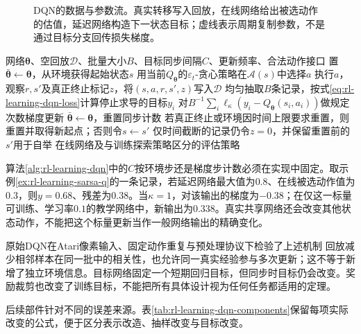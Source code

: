 \begin{figure}[t]
  \centering
  
  \caption{DQN的数据与参数流。真实转移写入回放，在线网络给出被选动作的估值，延迟网络构造下一状态目标；虚线表示周期复制参数，不是通过目标分支回传损失梯度。}
  \label{fig:rl-learning-dqn}
\end{figure}

\begin{algorithm}[包含数据收集的DQN循环]
  \label{alg:rl-learning-dqn}
  \begin{algorithmic}[1]
    \Require 网络$\bm\theta$、空回放$\mathcal D$、批量大小$B$、目标同步间隔$C$、更新频率、合法动作接口
    \State 置$\bar{\bm\theta}\gets\bm\theta$，从环境获得起始状态$s$
      \State 用当前$Q_{\bm\theta}$的$\varepsilon_t$-贪心策略在$\mathcal A(s)$中选择$a$
      \State 执行$a$，观察$r,s'$及真正终止标记$z$，将$(s,a,r,s',z)$写入$\mathcal D$
        \State 均匀抽取$B$条记录，按式\eqref{eq:rl-learning-dqn-loss}计算停止求导的目标$y_i$
        \State 对$B^{-1}\sum_i\ell_\kappa(y_i-Q_{\bm\theta}(s_i,a_i))$做规定次数梯度更新
      \EndIf
        \State $\bar{\bm\theta}\gets\bm\theta$，重置同步计数
      \EndIf
      \State 若真正终止或环境因时间上限要求重置，则重置并取得新起点；否则令$s\gets s'$
      \State 仅时间截断的记录仍令$z=0$，并保留重置前的$s'$用于自举
    \EndFor
    \Ensure 在线网络及与训练探索策略区分的评估策略
  \end{algorithmic}
\end{algorithm}

算法\ref{alg:rl-learning-dqn}中的$C$按环境步还是梯度步计数必须在实现中固定。取示例\ref{ex:rl-learning-sarsa-q}的一条记录，若延迟网络最大值为$0.8$、在线被选动作值为$0.3$，则$y=0.68$、残差为$0.38$。当$\kappa=1$，对该输出的梯度为$-0.38$；在仅这一标量可训练、学习率$0.1$的教学网络中，新输出为$0.338$。真实共享网络还会改变其他状态动作，不能把这个标量更新当作一般网络输出的精确变化。

原始DQN在Atari像素输入、固定动作重复与预处理协议下检验了上述机制
回放减少相邻样本在同一批中的相关性，也允许同一真实经验参与多次更新；这不等于新增了独立环境信息。目标网络固定一个短期回归目标，但同步时目标仍会改变。奖励裁剪也改变了训练目标，不能把所有具体设计视为任何任务都适用的定理。

后续部件针对不同的误差来源。表\ref{tab:rl-learning-dqn-components}保留每项实际改变的公式，便于区分表示改造、抽样改变与目标改变。

